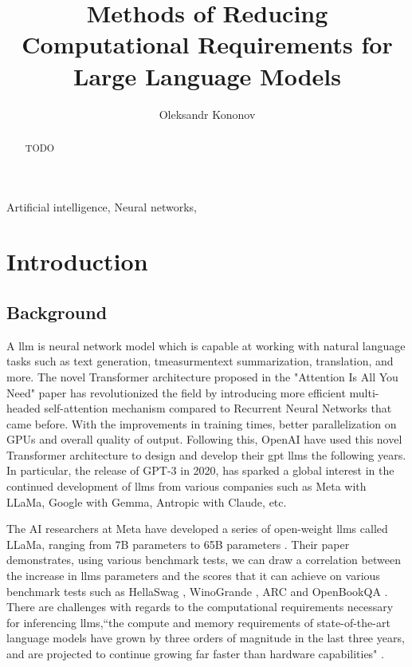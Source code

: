 \documentclass{ifacconf}
\begin{document}
	
	\begin{frontmatter}
		
		\title{Methods of Reducing Computational Requirements for Large Language Models} 
		
		\author[First]{Oleksandr Kononov} 
		
		\address[First]{South East Technological University, 
			Cork Road, Waterford, Ireland (e-mail: 20071032@mail.wit.ie).}
		\begin{abstract}                %
			TODO
		\end{abstract}
		
		\begin{keyword}
			Artificial intelligence, Neural networks, 
		\end{keyword}
		
	\end{frontmatter}
	\section{Introduction}
	\subsection{Background}
	A \gls{llm} is neural network model which is capable at working with natural language tasks such as text generation, tmeasurmentext summarization, translation, and more. The novel Transformer architecture proposed in the "Attention Is All You Need" paper \cite{vaswani2017attentionneed} has revolutionized the field by introducing more efficient multi-headed self-attention mechanism compared to Recurrent Neural Networks that came before. With the improvements in training times, better parallelization on GPUs and overall quality of output.
	Following this, OpenAI have used this novel Transformer architecture to design and develop their \gls{gpt} \glspl{llm} the following years. In particular, the release of GPT-3 in 2020, has sparked a global interest in the continued development of \glspl{llm} from various companies such as Meta with LLaMa, Google with Gemma, Antropic with Claude, etc.
	
	The AI researchers at Meta have developed a series of open-weight \glspl{llm} called LLaMa, ranging from 7B parameters to 65B parameters \cite{touvron2023llamaopenefficientfoundation}. Their paper demonstrates, using various benchmark tests, we can draw a correlation between the increase in \glspl{llm} parameters and the scores that it can achieve on various benchmark tests such as HellaSwag \cite{zellers2019hellaswagmachinereallyfinish}, WinoGrande \cite{sakaguchi2019winograndeadversarialwinogradschema}, ARC \cite{clark2018thinksolvedquestionanswering} and OpenBookQA \cite{mihaylov2018suitarmorconductelectricity}. There are challenges with regards to the computational requirements necessary for inferencing \glspl{llm},``the compute and memory requirements of state-of-the-art language models have grown by three orders of magnitude in the last three years, and are projected to continue growing far faster than hardware capabilities" \cite[p.~97]{bommasani2022opportunitiesrisksfoundationmodels}.
	
\end{document}
